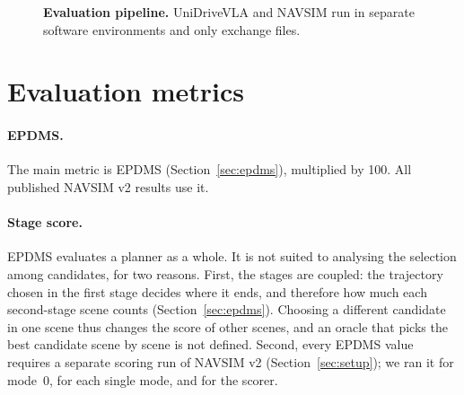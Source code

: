 \documentclass[11pt, a4paper, oneside]{book}
\begin{document}
\begin{figure}[t]
\centering
{}
\caption[Evaluation pipeline]{\textbf{Evaluation pipeline.} UniDriveVLA and NAVSIM run in separate
software environments and only exchange files.}
\label{fig:pipeline}
\end{figure}

\section{Evaluation metrics}
\label{sec:metrics}

\paragraph{EPDMS.} The main metric is EPDMS (Section~\ref{sec:epdms}), multiplied by 100. All
published NAVSIM v2 results use it.

\paragraph{Stage score.}
\label{sec:evalq}
EPDMS evaluates a planner as a whole. It is not suited to analysing the selection among
candidates, for two reasons. First, the stages are coupled: the trajectory chosen in the first
stage decides where it ends, and therefore how much each second-stage scene counts
(Section~\ref{sec:epdms}). Choosing a different candidate in one scene thus changes the score of
other scenes, and an oracle that picks the best candidate scene by scene is not defined.
Second, every EPDMS value requires a separate scoring run of NAVSIM v2
(Section~\ref{sec:setup}); we ran it for mode~0, for each single mode, and for the scorer.
\end{document}
